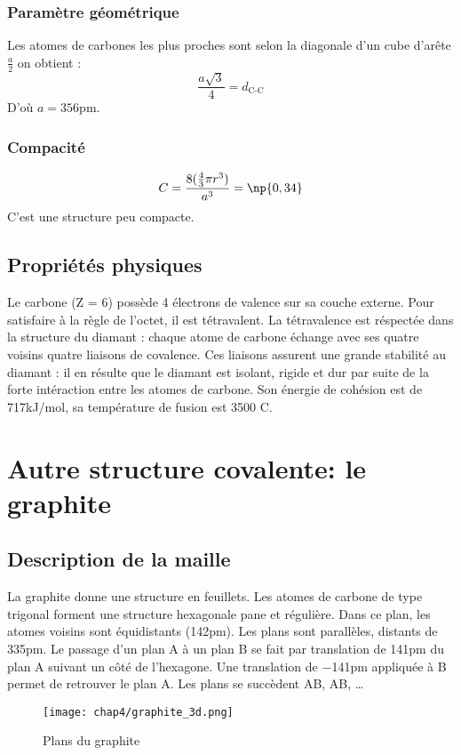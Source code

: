 \subsubsection{Paramètre géométrique}
Les atomes de carbones les plus proches sont selon la diagonale d’un cube d’arête
$\frac{a}{2}$ on obtient :
\begin{equation}
    \frac{a\sqrt{3}}{4} = d_\text{C-C}
\end{equation}
D'où $a = 356$pm.

\subsubsection{Compacité} 
\begin{equation}
    C = \frac{8(\frac{4}{3}\pi r^3)}{a^3} = \np{0,34}
\end{equation}
C'est une structure peu compacte.


\subsection{Propriétés physiques}
Le carbone (Z = 6) possède 4 électrons de valence sur sa couche externe. Pour
satisfaire à la règle de l’octet, il est tétravalent. La tétravalence est réspectée dans la structure
du diamant : chaque atome de carbone échange avec ses quatre voisins quatre liaisons
de covalence. Ces liaisons assurent une grande stabilité au diamant : il en résulte que
le diamant est isolant, rigide et dur par suite de la forte intéraction entre les atomes de
carbone.
Son énergie  
de cohésion est de 717kJ/mol, sa température 
de fusion est 3500
\degre C.


\section{Autre structure covalente: le graphite}
\subsection{Description de la maille}
La graphite donne une structure en feuillets. Les atomes de carbone de type trigonal
forment une structure hexagonale pane et régulière. Dans ce plan, les atomes voisins
sont équidistants (142pm). Les plans sont parallèles, distants de 335pm. Le passage
d’un plan A à un plan B se fait par translation de 141pm du plan A suivant un côté de
l’hexagone. Une translation de $-$141pm appliquée à B permet de retrouver le plan A.
Les plans se succèdent AB, AB, \dots
\begin{figure}
    \centering
    \texttt{[image: chap4/graphite\_3d.png]}
    \caption{Plans du graphite}\label{fig:4_graphite_3d}
\end{figure}

